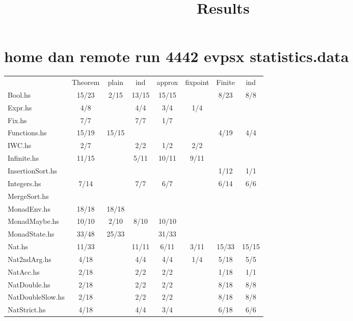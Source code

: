 \documentclass{article}
\begin{document}
\title{Results}
\maketitle

\section*{ home dan remote run 4442 evpsx statistics.data}
\begin{longtable}{l || c | c | c | c | c || c | c}
                              & Theorem & plain & ind & approx & fixpoint & Finite & ind \\
Bool.hs                       & 15/23 & 2/15 & 13/15 & 15/15 &  & 8/23 & 8/8\\
Expr.hs                       & 4/8 &  & 4/4 & 3/4 & 1/4 &  & \\
Fix.hs                        & 7/7 &  & 7/7 & 1/7 &  &  & \\
Functions.hs                  & 15/19 & 15/15 &  &  &  & 4/19 & 4/4\\
IWC.hs                        & 2/7 &  & 2/2 & 1/2 & 2/2 &  & \\
Infinite.hs                   & 11/15 &  & 5/11 & 10/11 & 9/11 &  & \\
InsertionSort.hs              &  &  &  &  &  & 1/12 & 1/1\\
Integers.hs                   & 7/14 &  & 7/7 & 6/7 &  & 6/14 & 6/6\\
MergeSort.hs                  &  &  &  &  &  &  & \\
MonadEnv.hs                   & 18/18 & 18/18 &  &  &  &  & \\
MonadMaybe.hs                 & 10/10 & 2/10 & 8/10 & 10/10 &  &  & \\
MonadState.hs                 & 33/48 & 25/33 &  & 31/33 &  &  & \\
Nat.hs                        & 11/33 &  & 11/11 & 6/11 & 3/11 & 15/33 & 15/15\\
Nat2ndArg.hs                  & 4/18 &  & 4/4 & 4/4 & 1/4 & 5/18 & 5/5\\
NatAcc.hs                     & 2/18 &  & 2/2 & 2/2 &  & 1/18 & 1/1\\
NatDouble.hs                  & 2/18 &  & 2/2 & 2/2 &  & 8/18 & 8/8\\
NatDoubleSlow.hs              & 2/18 &  & 2/2 & 2/2 &  & 8/18 & 8/8\\
NatStrict.hs                  & 4/18 &  & 4/4 & 3/4 &  & 6/18 & 6/6\\

\end{longtable}
\end{document}
